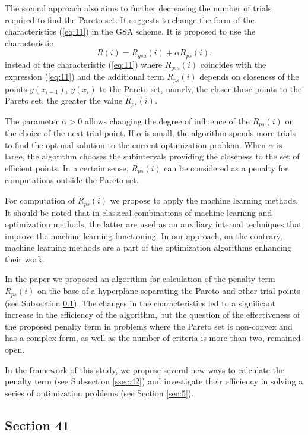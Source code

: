 \documentclass[runningheads]{llncs}
\begin{document}
The second approach also aims to further decreasing the number of trials required to find the Pareto set. It suggests to change the form of the characteristics (\ref{eq:11}) in the GSA scheme. It is proposed to use the characteristic 
\begin{equation}
    \label{eq:16}
    R(i) = R_{gsa} (i) +  \alpha R_{ps} (i).
\end{equation}
instead of the characteristic (\ref{eq:11}) where $R_{gsa}(i)$ coincides with the expression (\ref{eq:11}) and the additional term $R_{ps}(i)$ depends on closeness of the points $y(x_{i-1})$, $y(x_{i})$ to the Pareto set, namely, the closer these points to the Pareto set, the greater the value $R_{ps}(i)$.

The parameter $\alpha > 0$ allows changing the degree of influence of the $R_{ps}(i)$ on the choice of the next trial point. If $\alpha$ is small, the algorithm spends more trials to find the optimal solution to the current optimization problem. When $\alpha$ is large, the algorithm chooses the subintervals providing the closeness to the set of efficient points. In a certain sense, $R_{ps}(i)$ can be considered as a penalty for computations outside the Pareto set.

For computation of $R_{ps}(i)$ we propose to apply the machine learning methods. It should be noted that in classical combinations of machine learning and optimization methods, the latter are used as an auxiliary internal techniques that improve the machine learning functioning. In our approach, on the contrary, machine learning methods are a part of the optimization algorithms enhancing their work.

In the paper \cite{ML_MCO_2023} we proposed an algorithm for calculation of the penalty term $R_{ps}(i)$ on the base of a hyperplane separating the Pareto and other trial points (see Subsection \ref{ssec:41}). The changes in the characteristics led to a significant increase in the efficiency of the algorithm, but the question of the effectiveness of the proposed penalty term in problems where the Pareto set is non-convex and has a complex form, as well as the number of criteria is more than two, remained open.

In the framework of this study, we propose several new ways to calculate the penalty term (see Subsection \ref{ssec:42}) and investigate their efficiency in solving a series of optimization problems (see Section \ref{sec:5}).

\subsection{Section 41}
\label{ssec:41}
\end{document}
